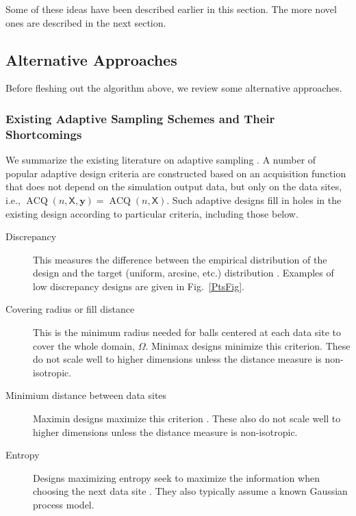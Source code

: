 \documentclass[11pt]{NSFamsart}
\DeclareMathOperator{\VAL}{ACQ}
\newcommand{\mX}{\mathsf{X}}
\newcommand{\by}{{\boldsymbol{y}}}
\begin{document}
Some of these ideas have been described earlier in this section.  The more novel ones are described in the next section.

\subsection{Alternative Approaches}
Before fleshing out the algorithm above, we review some alternative  approaches.

\subsubsection{Existing Adaptive Sampling Schemes and Their Shortcomings} \label{sec:shortExist}

We summarize the existing literature on adaptive sampling \cite{aute2013cross,burnaev2015adaptive,fu2017adaptive,gramacy2008adaptive,jin2002sequential,kleijnen2004application}. A number of popular adaptive design criteria are constructed based on an acquisition function that does not depend on the simulation output data, but only on the data sites, i.e., $\VAL(n,\mX,\by) = \VAL(n,\mX)$. Such adaptive designs fill in holes in the existing design according to particular criteria, including those below. 
\begin{description}
	\item[Discrepancy] This measures the difference between the empirical distribution of the design and the target (uniform, arcsine, etc.) distribution \cite{FangEtal19a}. Examples of low discrepancy designs are given in Fig.\ \ref{PtsFig}. 
	\item[Covering radius or fill distance] This is the minimum radius needed for balls centered at each data site to cover the whole domain, $\Omega$. Minimax designs minimize this criterion.  These do not scale well to higher dimensions unless the distance measure is non-isotropic.
	\item[Minimium distance between data sites] Maximin designs maximize this criterion \cite{jin2002sequential}.  These also do not scale well to higher dimensions unless the distance measure is non-isotropic.
	\item[Entropy] Designs maximizing entropy seek to maximize the information when choosing the next data site \cite{jin2002sequential}. They also typically assume a known Gaussian process model.
\end{description}
\end{document}
